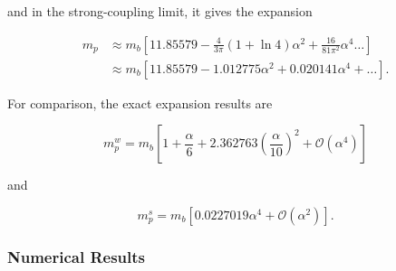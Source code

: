and in the strong-coupling limit, it gives the expansion

\begin{equation}
    \label{eqn:strong_mass_feynman}
    \begin{aligned}
    m_p &\approx m_b \left[ 11.85579 - \frac{4}{3\pi} (1 + \ln 4) \alpha^2 + \frac{16}{81\pi^2} \alpha^4 \dots \right] \\
    &\approx m_b \left[11.85579 - 1.012775 \alpha^2 + 0.020141 \alpha^4 + \dots\right].
    \end{aligned}
\end{equation}

For comparison, the exact expansion results are

\begin{equation}
    m^w_p = m_b \left[ 1 + \frac{\alpha}{6} + 2.362763 \left(\frac{\alpha}{10}\right)^2 + \mathcal{O}\left(\alpha^4\right) \right]
\end{equation}

and

\begin{equation}
    m^s_p = m_b \left[ 0.0227019 \alpha^4 + \mathcal{O}\left(\alpha^2\right) \right].
\end{equation}

\subsubsection{Numerical Results}

